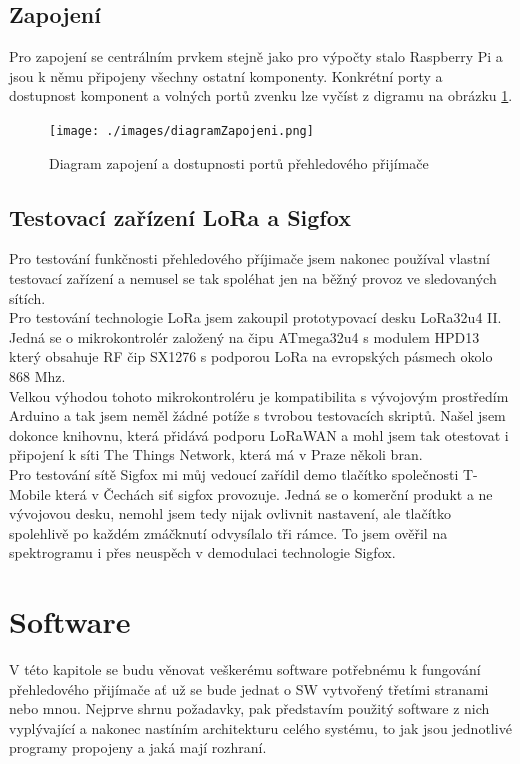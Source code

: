 \documentclass{ctuthesis}
\begin{document}
\section{Zapojení}
Pro zapojení se centrálním prvkem stejně jako pro výpočty stalo Raspberry Pi a jsou k němu připojeny všechny ostatní komponenty. Konkrétní porty a dostupnost komponent a volných portů zvenku lze vyčíst z digramu na obrázku \ref{zapojení}.
\begin{figure}
\caption{Diagram zapojení a dostupnosti portů přehledového přijímače}
\texttt{[image: ./images/diagramZapojeni.png]}
\label{zapojení}
\end{figure}
\section{Testovací zařízení LoRa a Sigfox}
Pro testování funkčnosti přehledového příjimače jsem nakonec používal vlastní testovací zařízení a nemusel se tak spoléhat jen na běžný provoz ve sledovaných sítích.\\
Pro testování technologie LoRa jsem zakoupil prototypovací desku LoRa32u4 II. Jedná se o mikrokontrolér založený na čipu ATmega32u4 s modulem HPD13 který obsahuje RF čip SX1276 s podporou LoRa na evropských pásmech okolo 868 Mhz. \\
Velkou výhodou tohoto mikrokontroléru je kompatibilita s vývojovým prostředím Arduino a tak jsem neměl žádné potíže s tvrobou testovacích skriptů. Našel jsem dokonce knihovnu, která přidává podporu LoRaWAN a mohl jsem tak otestovat i připojení k síti The Things Network, která má v Praze několi bran.
\\Pro testování sítě Sigfox mi můj vedoucí zařídil demo tlačítko společnosti T-Mobile která v Čechách siť sigfox provozuje. Jedná se o komerční produkt a ne vývojovou desku, nemohl jsem tedy nijak ovlivnit nastavení, ale tlačítko spolehlivě po každém zmáčknutí odvysílalo tři rámce. To jsem ověřil na spektrogramu i přes neuspěch v demodulaci technologie Sigfox.

\chapter{Software}

V této kapitole se budu věnovat veškerému software potřebnému k fungování přehledového přijímače ať už se bude jednat o SW vytvořený třetími stranami nebo mnou. Nejprve shrnu požadavky, pak představím použitý software z nich vyplývající a nakonec nastíním architekturu celého systému, to jak jsou jednotlivé programy propojeny a jaká mají rozhraní.
\end{document}
